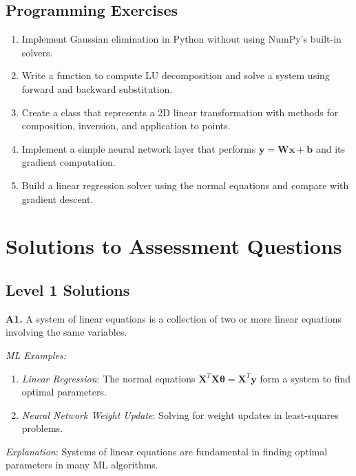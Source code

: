 \documentclass[12pt,a4paper]{article}
\theoremstyle{definition}
\begin{document}
\subsection{Programming Exercises}

\begin{enumerate}[label=\textbf{P\arabic*.}]
\item Implement Gaussian elimination in Python without using NumPy's built-in solvers.

\item Write a function to compute LU decomposition and solve a system using forward and backward substitution.

\item Create a class that represents a 2D linear transformation with methods for composition, inversion, and application to points.

\item Implement a simple neural network layer that performs $\mathbf{y} = \mathbf{Wx} + \mathbf{b}$ and its gradient computation.

\item Build a linear regression solver using the normal equations and compare with gradient descent.
\end{enumerate}

\newpage

\section{Solutions to Assessment Questions}

\subsection{Level 1 Solutions}

\textbf{A1.} A system of linear equations is a collection of two or more linear equations involving the same variables. 

\textit{ML Examples:}
\begin{enumerate}
\item \textit{Linear Regression}: The normal equations $\mathbf{X}^T\mathbf{X}\boldsymbol{\theta} = \mathbf{X}^T\mathbf{y}$ form a system to find optimal parameters.
\item \textit{Neural Network Weight Update}: Solving for weight updates in least-squares problems.
\end{enumerate}

\textit{Explanation}: Systems of linear equations are fundamental in finding optimal parameters in many ML algorithms.
\end{document}
